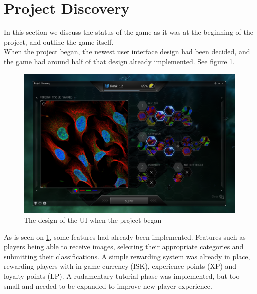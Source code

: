 \section{Project Discovery}\label{sec:project_discovery}
In this section we discuss the status of the game as it was at the beginning of the project, and outline the game itself.\\

When the project began, the newest user interface design had been decided, and the game had around half of that design already implemented. See figure \ref{fig:PD}.

\begin{figure}[H]
	\centering
	\graphicspath{ {./graphics/} }
    \centerline{\includegraphics[width=15cm]{PD.png}}
    \caption{\label{fig:PD}The design of the UI when the project began}
\end{figure}

As is seen on \ref{fig:PD}, some features had already been implemented. Features such as players being able to receive images, selecting their appropriate categories and submitting their classifications. A simple rewarding system was already in place, rewarding players with in game currency (ISK), experience points (XP) and loyalty points (LP). A rudamentary tutorial phase was implemented, but too small and needed to be expanded to improve new player experience.\\

